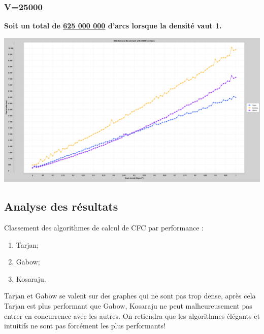 \documentclass[11pt,a4paper]{article}
\begin{document}
\subsubsection{V=25000}
\textbf{Soit un total de \underline{625 000 000} d'arcs lorsque la densité vaut 1.}
\begin{center}
\includegraphics[keepaspectratio=true,width=\linewidth]{./SCCSolvers_25000.png}
\end{center}

\subsection{Analyse des résultats}

Classement des algorithmes de calcul de CFC par performance :
\begin{enumerate}
\item Tarjan;
\item Gabow;
\item Kosaraju.
\end{enumerate}

Tarjan et Gabow se valent sur des graphes qui ne sont pas trop dense, après cela Tarjan est plus performant que Gabow, Kosaraju ne peut malheureusement pas entrer en concurrence avec les autres. On retiendra que les algorithmes élégants et intuitifs ne sont pas forcément les plus performants!
\end{document}
